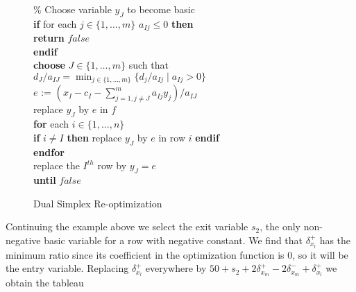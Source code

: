 \documentclass{uist96}
\begin{document}
{\begin{figure}[tb]
\begin{center}
{\begin{minipage}{10cm}
\begin{tabbing}
\> \> \% Choose variable $y_J$ to become basic\\
\> \> \textbf{if} for each $j \in \{ 1, \ldots , m\}$ $a_{Ij} \leq 0$ \textbf{then} \\
\> \> \> \textbf{return} $false$\\
\> \> \textbf{endif} \\
\> \> \textbf{choose} $J \in \{1, \ldots , m\}$ such that\\
\> \> \> $d_J / a_{IJ} =
    \min_{j \in \{1, \ldots , m\}} \{ d_j / a_{Ij} \mid a_{Ij} > 0 \}$\\
\> \> $e$ := $( x_I - c_I - \sum_{j=1, j\ne J}^m a_{Ij} y_j)/ a_{IJ}$\\
\> \> replace $y_J$ by $e$ in $f$\\
\> \> \textbf{for} each $i \in \{1, \ldots ,n\}$\\
\> \> \> \textbf{if} $i \ne I$ \textbf{then}
       replace $y_J$ by $e$ in row $i$ \textbf{endif}\\
\> \> \textbf{endfor}\\
\> \> replace the $I^{th}$ row by $y_J = e$ \\
\> \textbf{until} $false$ \\
\end{tabbing}
\end{minipage}
}
\end{center}
\caption{Dual Simplex Re-optimization\label{fig:simplex-dual}}
\end{figure}
}

Continuing the example above
we select the exit variable $s_2$, 
the only non-negative basic variable for a row with negative constant.  
We find that $\delta_{x_l}^+$
has the minimum ratio since its coefficient in the optimization function
is 0, so it will be the entry variable.
Replacing $\delta_{x_l}^+$ everywhere by 
$50 + s_2 + 2 \delta_{x_m}^+ - 2 \delta_{x_m}^- + \delta_{x_l}^+$
we obtain the tableau
\end{document}
